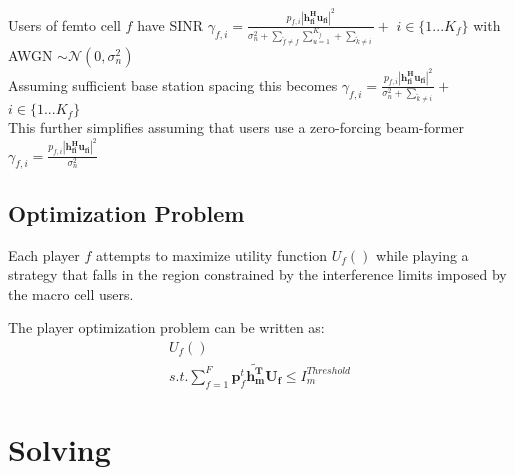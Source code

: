 \documentclass[12pt]{article}
\begin{document}
Users of femto cell $f$ have SINR $\gamma_{f,i} = \frac{p_{f,i}|\mathbf{h^H_{fi}u_{fi}}|^2}
{\sigma^2_{n}  + \sum_{\tilde{f}\neq f} \sum_{u=1}^{K_{\tilde{f}}} + \sum_{\tilde{k}\neq i}}+$   $i \in \{1 ... K_f\}$
with AWGN $\sim \mathcal{N}(0,\sigma^2_n)$
\\

Assuming sufficient base station spacing this becomes 
$\gamma_{f,i} = \frac{p_{f,i}|\mathbf{h^H_{fi}u_{fi}}|^2}
{\sigma^2_{n}  +  \sum_{\tilde{k}\neq i}}+$   $i \in \{1 ... K_f\}$
\\

This further simplifies assuming that users use a zero-forcing beam-former
$\gamma_{f,i} = \frac{p_{f,i}|\mathbf{h^H_{fi}u_{fi}}|^2}{\sigma^2_{n} }$
\\


\subsection{Optimization Problem}

Each player $f$ attempts to maximize utility function $U_f()$ while playing a strategy that falls in the region constrained by the interference limits imposed by the macro cell users.

The player optimization problem can be written as:
\\

\begin{gather*} 
U_f() 
\\
s.t. \sum^F_{f=1} \mathbf{p}_f^t \mathbf{\tilde{h_m^T}}  \mathbf{U_f}  \leq I^{Threshold}_{m} 
\end{gather*}


\section{Solving}
\end{document}

